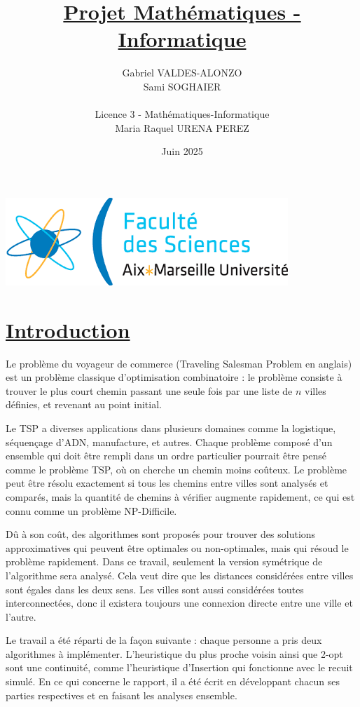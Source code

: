 \documentclass[a4paper,11pt,fleqn]{article}
\title{\underline{Projet Mathématiques - Informatique}}
\author{Gabriel VALDES-ALONZO\\ Sami SOGHAIER  \\\\ Licence 3 - Mathématiques-Informatique \\ Maria Raquel URENA PEREZ }
\date{Juin 2025}
\begin{document}
\maketitle
\begin{center}
    \includegraphics[scale=0.7]{index.png}
\end{center}

\newpage
{}

\section*{\underline{Introduction}}
Le problème du voyageur de commerce \cite{book:TSP,chap:TSP} (Traveling Salesman Problem en anglais) est un problème classique d’optimisation combinatoire : le problème consiste à trouver le plus court chemin passant une seule fois par une liste de $n$ villes définies, et revenant au point initial.

Le TSP a diverses applications dans plusieurs domaines comme la logistique, séquençage d'ADN, manufacture, et autres. Chaque problème composé d'un ensemble qui doit être rempli dans un ordre particulier pourrait être pensé comme le problème TSP, où on cherche un chemin moins coûteux. Le problème peut être résolu exactement si tous les chemins entre villes sont analysés et comparés, mais la quantité de chemins à vérifier augmente rapidement, ce qui est connu comme un problème NP-Difficile.

Dû à son coût, des algorithmes sont proposés pour trouver des solutions approximatives qui peuvent être optimales ou non-optimales, mais qui résoud le problème rapidement. Dans ce travail, seulement la version symétrique de l'algorithme sera analysé. Cela veut dire que les distances considérées entre villes sont égales dans les deux sens. Les villes sont aussi considérées toutes interconnectées, donc il existera toujours une connexion directe entre une ville et l'autre.

Le travail a été réparti de la façon suivante : chaque personne a pris deux algorithmes à implémenter. L'heuristique du plus proche voisin ainsi que 2-opt sont une continuité, comme l'heuristique d'Insertion qui fonctionne avec le recuit simulé. En ce qui concerne le rapport, il a été écrit en développant chacun ses parties respectives et en faisant les analyses ensemble.
\end{document}
